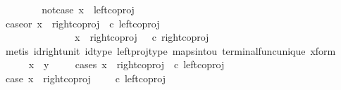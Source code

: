 \begin{isabellebody}
\ \ \isamarkupfalse%
\isanewline
\ \ \ \ \isamarkupfalse%
\ not{\isacharunderscore}{\kern0pt}case{}{\isacharcolon}{\kern0pt}\ {\isachardoublequoteopen}x\ {\isasymnoteq}\ left{\isacharunderscore}{\kern0pt}coproj\ {\isasymone}\ {\isacharparenleft}{\kern0pt}{\isasymone}\ {\isasymCoprod}\ {\isasymone}{\isacharparenright}{\kern0pt}{\isachardoublequoteclose}\isanewline
\ \ \ \ \isamarkupfalse%
\ \isamarkupfalse%
\ case{}{\isacharunderscore}{\kern0pt}or{\isacharunderscore}{\kern0pt}{}{\isacharcolon}{\kern0pt}\ {\isachardoublequoteopen}x\ {\isacharequal}{\kern0pt}\ right{\isacharunderscore}{\kern0pt}coproj\ {\isasymone}\ {\isacharparenleft}{\kern0pt}{\isasymone}{\isasymCoprod}{\isasymone}{\isacharparenright}{\kern0pt}{\isasymcirc}\isactrlsub c\ left{\isacharunderscore}{\kern0pt}coproj\ {\isasymone}\ {\isasymone}\ {\isasymor}\ \isanewline
\ \ \ \ \ \ \ \ \ \ \ \ \ \ \ x\ {\isacharequal}{\kern0pt}\ right{\isacharunderscore}{\kern0pt}coproj\ {\isasymone}\ {\isacharparenleft}{\kern0pt}{\isasymone}{\isasymCoprod}{\isasymone}{\isacharparenright}{\kern0pt}\ {\isasymcirc}\isactrlsub c\ right{\isacharunderscore}{\kern0pt}coproj\ {\isasymone}\ {\isasymone}{\isachardoublequoteclose}\isanewline
\ \ \ \ \ \ \isamarkupfalse%
\ {\isacharparenleft}{\kern0pt}metis\ id{\isacharunderscore}{\kern0pt}right{\isacharunderscore}{\kern0pt}unit{}\ id{\isacharunderscore}{\kern0pt}type\ left{\isacharunderscore}{\kern0pt}proj{\isacharunderscore}{\kern0pt}type\ maps{\isacharunderscore}{\kern0pt}into{\isacharunderscore}{\kern0pt}{}u{}\ terminal{\isacharunderscore}{\kern0pt}func{\isacharunderscore}{\kern0pt}unique\ x{\isacharunderscore}{\kern0pt}form{\isacharparenright}{\kern0pt}\isanewline
\ \ \ \ \isamarkupfalse%
\ {\isachardoublequoteopen}x\ {\isacharequal}{\kern0pt}\ y{\isachardoublequoteclose}\isanewline
\ \ \ \ \isamarkupfalse%
{\isacharparenleft}{\kern0pt}cases\ {\isachardoublequoteopen}x\ {\isacharequal}{\kern0pt}\ right{\isacharunderscore}{\kern0pt}coproj\ {\isasymone}\ {\isacharparenleft}{\kern0pt}{\isasymone}{\isasymCoprod}{\isasymone}{\isacharparenright}{\kern0pt}{\isasymcirc}\isactrlsub c\ left{\isacharunderscore}{\kern0pt}coproj\ {\isasymone}\ {\isasymone}{\isachardoublequoteclose}{\isacharparenright}{\kern0pt}\isanewline
\ \ \ \ \ \ \isamarkupfalse%
\ case{}{\isacharcolon}{\kern0pt}\ {\isachardoublequoteopen}x\ {\isacharequal}{\kern0pt}\ right{\isacharunderscore}{\kern0pt}coproj\ {\isasymone}\ {\isacharparenleft}{\kern0pt}{\isasymone}\ {\isasymCoprod}\ {\isasymone}{\isacharparenright}{\kern0pt}\ {\isasymcirc}\isactrlsub c\ left{\isacharunderscore}{\kern0pt}coproj\ {\isasymone}\ {\isasymone}{\isachardoublequoteclose}\isanewline

\end{isabellebody}
